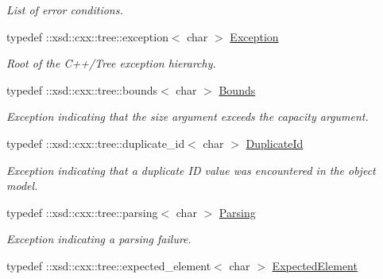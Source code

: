 \begin{DoxyCompactItemize}
\begin{DoxyCompactList}\small\item\em List of error conditions. \item\end{DoxyCompactList}\item 
\hypertarget{namespacexml__schema_ac873abff0228946d91e7ababf2cededc}{
typedef ::xsd::cxx::tree::exception$<$ char $>$ \hyperlink{namespacexml__schema_ac873abff0228946d91e7ababf2cededc}{Exception}}
\label{namespacexml__schema_ac873abff0228946d91e7ababf2cededc}

\begin{DoxyCompactList}\small\item\em Root of the C++/Tree exception hierarchy. \item\end{DoxyCompactList}\item 
\hypertarget{namespacexml__schema_a8ad4f95d0dda1ea131f69a7231deb0fe}{
typedef ::xsd::cxx::tree::bounds$<$ char $>$ \hyperlink{namespacexml__schema_a8ad4f95d0dda1ea131f69a7231deb0fe}{Bounds}}
\label{namespacexml__schema_a8ad4f95d0dda1ea131f69a7231deb0fe}

\begin{DoxyCompactList}\small\item\em Exception indicating that the size argument exceeds the capacity argument. \item\end{DoxyCompactList}\item 
\hypertarget{namespacexml__schema_a54fd4ff8caf281b84358720a39d7573a}{
typedef ::xsd::cxx::tree::duplicate\_\-id$<$ char $>$ \hyperlink{namespacexml__schema_a54fd4ff8caf281b84358720a39d7573a}{DuplicateId}}
\label{namespacexml__schema_a54fd4ff8caf281b84358720a39d7573a}

\begin{DoxyCompactList}\small\item\em Exception indicating that a duplicate ID value was encountered in the object model. \item\end{DoxyCompactList}\item 
\hypertarget{namespacexml__schema_a439552700a98fdcf8db5e211f47edcb6}{
typedef ::xsd::cxx::tree::parsing$<$ char $>$ \hyperlink{namespacexml__schema_a439552700a98fdcf8db5e211f47edcb6}{Parsing}}
\label{namespacexml__schema_a439552700a98fdcf8db5e211f47edcb6}

\begin{DoxyCompactList}\small\item\em Exception indicating a parsing failure. \item\end{DoxyCompactList}\item 
\hypertarget{namespacexml__schema_affcd8b87d336cb78c21a358711d4e876}{
typedef ::xsd::cxx::tree::expected\_\-element$<$ char $>$ \hyperlink{namespacexml__schema_affcd8b87d336cb78c21a358711d4e876}{ExpectedElement}}
\label{namespacexml__schema_affcd8b87d336cb78c21a358711d4e876}


\end{DoxyCompactItemize}
